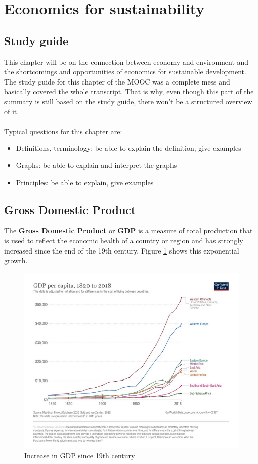 \documentclass[../summary.tex]{subfiles}
\begin{document}
	
	\section{Economics for sustainability}
	
	\subsection{Study guide}
	
	This chapter will be on the connection between economy and environment and the shortcomings and opportunities of economics for sustainable development. The study guide for this chapter of the MOOC was a complete mess and basically covered the whole transcript. That is why, even though this part of the summary is still based on the study guide, there won't be a structured overview of it.
	\\\\
	Typical questions for this chapter are:
	\begin{itemize}
		\item Definitions, terminology: be able to explain the definition, give examples
		\item Graphs: be able to explain and interpret the graphs
		\item Principles: be able to explain, give examples
	\end{itemize}
	
	\subsection{Gross Domestic Product}
	\label{sec:10-gdp}
	
	The \textbf{Gross Domestic Product} or \textbf{GDP} is a measure of total production that is used to reflect the economic health of a country or region and has strongly increased since the end of the 19th century. Figure \ref{fig:GDP} shows this exponential growth.
		
	\begin{figure}[htbp]
		\centering
		\includegraphics[width=1\linewidth]{images/10-GDP-increase.png}
		\caption{Increase in GDP since 19th century}
		\label{fig:GDP}
	\end{figure}
	
\end{document}
